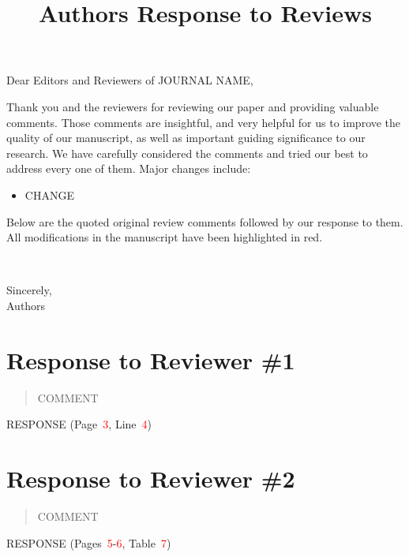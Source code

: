 \documentclass[10pt]{article}
\title{\textbf{Authors Response to Reviews}}
\author{}
\date{\begin{flushright}\today\end{flushright}}
\newcommand{\fref}[1]{\textcolor{red}{#1}} %
\newcommand{\ftabref}[1]{Table~\fref{#1}}
\newcommand{\fpgref}[1]{Page~\fref{#1}} %
\newcommand{\fpgsref}[2]{Pages~\fref{#1}-\fref{#2}} %
\newcommand{\flnref}[1]{Line~\fref{#1}}
\newenvironment{bgquote}
{
  \begin{tcolorbox}[
    enhanced,
    colback=gray!7,         %
    colframe=gray!7,        %
    arc=7pt,                %
    rounded corners=east,
    sharp corners=west,
    left=0pt,               %
    right=0pt,              %
    top=2pt,                %
    bottom=5pt,             %
    borderline west={3pt}{0pt}{gray!20},
  ]
  \begin{quote}
  \itshape %
}
{\end{quote}\end{tcolorbox}}
\begin{document}
\maketitle

\noindent Dear Editors and Reviewers of JOURNAL NAME,\newline

Thank you and the reviewers for reviewing our paper and providing valuable comments.
Those comments are insightful,
and very helpful for us to improve the quality of our manuscript,
as well as important guiding significance to our research.
We have carefully considered the comments and tried our best to address every one of them.
Major changes include:
\begin{itemize}
  \item CHANGE
\end{itemize}

Below are the quoted original review comments followed by our response to them.
All modifications in the manuscript have been highlighted in red.

~\newline

Sincerely, \\
Authors

\newpage
\section*{Response to Reviewer \#1}

\begin{bgquote}
COMMENT
\end{bgquote}

RESPONSE (\fpgref{3}, \flnref{4})


\newpage
\section*{Response to Reviewer \#2}

\begin{bgquote}
COMMENT
\end{bgquote}

RESPONSE (\fpgsref{5}{6}, \ftabref{7})
\end{document}
